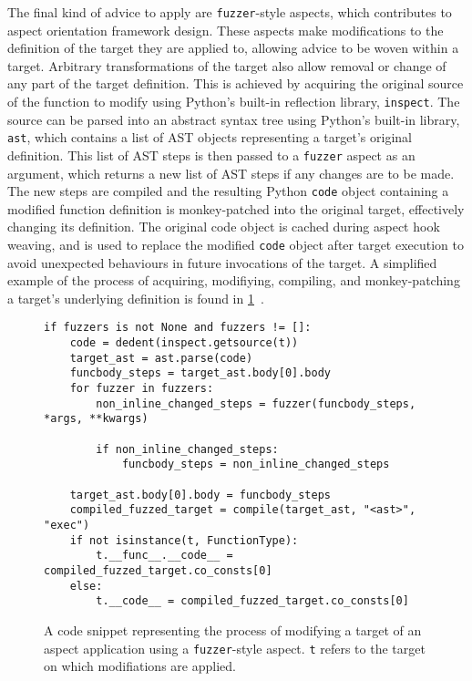 
The final kind of advice to apply are \lstinline{fuzzer}-style aspects, which
\pdsf contributes to aspect orientation framework design. These aspects make
modifications to the definition of the target they are applied to, allowing
advice to be woven within a target. Arbitrary transformations of the target also
allow removal or change of any part of the target definition. This is achieved
by acquiring the original source of the function to modify using Python's
built-in reflection library, \lstinline{inspect}. The source can be parsed into
an abstract syntax tree using Python's built-in library, \lstinline{ast}, which
contains a list of AST objects representing a target's original definition. This
list of AST steps is then passed to a \lstinline{fuzzer} aspect as an argument,
which returns a new list of AST steps if any changes are to be made. The new
steps are compiled and the resulting Python \lstinline{code} object containing a
modified function definition is monkey-patched into the original target,
effectively changing its definition. The original code object is cached during
aspect hook weaving, and is used to replace the modified \lstinline{code} object
after target execution to avoid unexpected behaviours in future invocations of
the target. A simplified example of the process of acquiring, modifiying,
compiling, and monkey-patching a target's underlying definition is found in
\cref{fig:simplified_fuzzer_application_example}~.

\begin{figure}
    \begin{lstlisting}
if fuzzers is not None and fuzzers != []:
    code = dedent(inspect.getsource(t))
    target_ast = ast.parse(code)
    funcbody_steps = target_ast.body[0].body
    for fuzzer in fuzzers:
        non_inline_changed_steps = fuzzer(funcbody_steps, *args, **kwargs)

        if non_inline_changed_steps:
            funcbody_steps = non_inline_changed_steps

    target_ast.body[0].body = funcbody_steps
    compiled_fuzzed_target = compile(target_ast, "<ast>", "exec")
    if not isinstance(t, FunctionType):
        t.__func__.__code__ =  compiled_fuzzed_target.co_consts[0]
    else:
        t.__code__ = compiled_fuzzed_target.co_consts[0]    \end{lstlisting}
    \caption{A code snippet representing the process of modifying a target of an aspect application using a
    \lstinline{fuzzer}-style aspect. \lstinline{t} refers to the target on which
    modifiations are applied.}
    \label{fig:simplified_fuzzer_application_example}
\end{figure}

